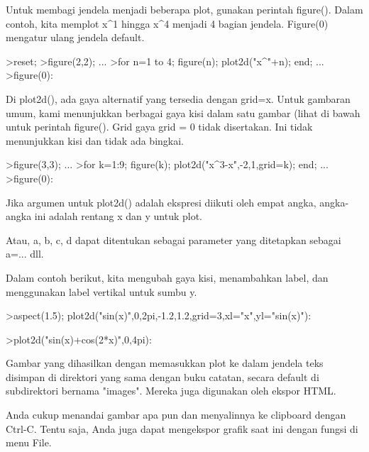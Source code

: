 \documentclass[a4paper,10pt]{article}
\begin{document}
\begin{eulernotebook}
\begin{eulercomment}
\begin{eulercomment}
\begin{eulercomment}
\begin{eulercomment}
\begin{eulercomment}
\begin{eulercomment}
\begin{eulercomment}
\begin{eulercomment}
\begin{eulercomment}
\begin{eulercomment}
\begin{eulercomment}
\begin{eulercomment}
\begin{eulercomment}
\begin{eulercomment}
\begin{eulercomment}
Untuk membagi jendela menjadi beberapa plot, gunakan perintah
figure(). Dalam contoh, kita memplot x\textasciicircum{}1 hingga x\textasciicircum{}4 menjadi 4 bagian
jendela. Figure(0) mengatur ulang jendela default.
\end{eulercomment}
\begin{eulerprompt}
>reset;
>figure(2,2); ...
>for n=1 to 4; figure(n); plot2d("x^"+n); end; ...
>figure(0):
\end{eulerprompt}
\begin{eulercomment}
Di plot2d(), ada gaya alternatif yang tersedia dengan grid=x. Untuk
gambaran umum, kami menunjukkan berbagai gaya kisi dalam satu gambar
(lihat di bawah untuk perintah figure(). Grid gaya grid = 0 tidak
disertakan. Ini tidak menunjukkan kisi dan tidak ada bingkai.
\end{eulercomment}
\begin{eulerprompt}
>figure(3,3); ...
>for k=1:9; figure(k); plot2d("x^3-x",-2,1,grid=k); end; ...
>figure(0):
\end{eulerprompt}
\begin{eulercomment}
Jika argumen untuk plot2d() adalah ekspresi diikuti oleh empat angka,
angka-angka ini adalah rentang x dan y untuk plot.

Atau, a, b, c, d dapat ditentukan sebagai parameter yang ditetapkan
sebagai a=... dll.

Dalam contoh berikut, kita mengubah gaya kisi, menambahkan label, dan
menggunakan label vertikal untuk sumbu y.
\end{eulercomment}
\begin{eulerprompt}
>aspect(1.5); plot2d("sin(x)",0,2pi,-1.2,1.2,grid=3,xl="x",yl="sin(x)"):
\end{eulerprompt}
\begin{eulerprompt}
>plot2d("sin(x)+cos(2*x)",0,4pi):
\end{eulerprompt}
\begin{eulercomment}
Gambar yang dihasilkan dengan memasukkan plot ke dalam jendela teks
disimpan di direktori yang sama dengan buku catatan, secara default di
subdirektori bernama "images". Mereka juga digunakan oleh ekspor HTML.

Anda cukup menandai gambar apa pun dan menyalinnya ke clipboard dengan
Ctrl-C. Tentu saja, Anda juga dapat mengekspor grafik saat ini dengan
fungsi di menu File.


\end{eulercomment}
\end{eulercomment}
\end{eulercomment}
\end{eulercomment}
\end{eulercomment}
\end{eulercomment}
\end{eulercomment}
\end{eulercomment}
\end{eulercomment}
\end{eulercomment}
\end{eulercomment}
\end{eulercomment}
\end{eulercomment}
\end{eulercomment}
\end{eulercomment}
\end{eulernotebook}
\end{document}
